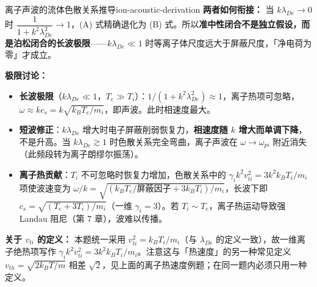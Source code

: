 \begin{example}{离子声波的流体色散关系推导}{ion-acoustic-derivation}
\smallskip
\textbf{两者如何衔接：} 当 $k\lambda_{De}\to0$ 时 $\dfrac{1}{1+k^2\lambda_{De}^2}\to1$，(A) 式精确退化为 (B) 式。所以\textbf{准中性闭合不是独立假设，而是泊松闭合的长波极限}——$k\lambda_{De}\ll1$ 时等离子体尺度远大于屏蔽尺度，「净电荷为零」才成立。

\textbf{极限讨论：}
\begin{itemize}[leftmargin=*,itemsep=0pt]
\item \textbf{长波极限}（$k\lambda_{De}\ll1$，$T_e\gg T_i$）：$1/(1+k^2\lambda_{De}^2)\approx1$，离子热项可忽略，$\omega \approx kc_s = k\sqrt{k_{\!B}T_e/m_i}$，即声波。此时相速度最大。
\item \textbf{短波修正}：$k\lambda_{De}$ 增大时电子屏蔽削弱恢复力，\textbf{相速度随 $k$ 增大而单调下降}，不是升高。当 $k\lambda_{De}\gtrsim1$ 时色散关系完全弯曲，离子声波在 $\omega\to\omega_{pi}$ 附近消失（此频段转为离子朗缪尔振荡）。
\item \textbf{离子热贡献}：$T_i$ 不可忽略时恢复力增加，色散关系中的 $\gamma_i k^2v_{ti}^2=3k^2k_{\!B}T_i/m_i$ 项使波速变为 $\omega/k=\sqrt{(k_{\!B}T_e/\text{屏蔽因子}+3k_{\!B}T_i)/m_i}$，长波下即 $c_s=\sqrt{(T_e+3T_i)/m_i}$（一维 $\gamma_i=3$）。若 $T_i\sim T_e$，离子热运动导致强 Landau 阻尼（第 7 章），波难以传播。
\end{itemize}

\textbf{关于 $v_{ti}$ 的定义：} 本题统一采用 $v_{ti}^2=k_{\!B}T_i/m_i$（与 $\lambda_{De}$ 的定义一致），故一维离子绝热项写作 $\gamma_i k^2v_{ti}^2=3k^2k_{\!B}T_i/m_i$。注意这与「热速度」的另一种常见定义 $v_{th}=\sqrt{2k_{\!B}T/m}$ 相差 $\sqrt2$，见上面的离子热速度例题；在同一题内必须只用一种定义。
\end{example}

